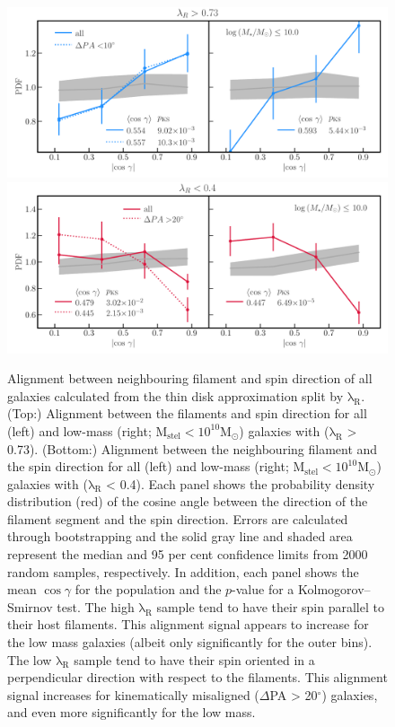 \begin{figure}
\centering\includegraphics[width=\textwidth]{thesis/latex/cw_spin/spin_fil_high_lambdaR_2in1.pdf}\\
\centering\includegraphics[width=\textwidth]{thesis/latex/cw_spin/spin_fil_low_lambdaR_2in1.pdf}
\caption{Alignment between neighbouring filament and spin direction of all galaxies calculated from the thin disk approximation split by $\mathrm{\lambda_R}$. (Top:) Alignment between the filaments and spin direction for all (left) and low-mass (right; $\mathrm{M_{stel} < 10^{10} M_{\odot}}$) galaxies with ($\mathrm{\lambda_{R}}$ > 0.73). (Bottom:) Alignment between the neighbouring filament and the spin direction for all (left) and low-mass (right; $\mathrm{M_{stel} < 10^{10} M_{\odot}}$) galaxies with ($\mathrm{\lambda_{R}}$ < 0.4). Each panel shows the probability density distribution (red) of the cosine angle between the direction of the filament segment and the spin direction. Errors are calculated through bootstrapping and the solid gray line and shaded area represent the median and 95 per cent confidence limits from 2000 random samples, respectively. In addition, each panel shows the mean $\cos \gamma$ for the population and the $p$-value for a Kolmogorov--Smirnov test. The high $\mathrm{\lambda_R}$ sample tend to have their spin parallel to their host filaments. This alignment signal appears to increase for the low mass galaxies (albeit only significantly for the outer bins). The low $\mathrm{\lambda_R}$ sample tend to have their spin oriented in a perpendicular direction with respect to the filaments. This alignment signal increases for kinematically misaligned ($\Delta$PA > 20$^{\circ}$) galaxies, and even more significantly for the low mass.}
\label{fig:lambdaR_spin_alignment}
\end{figure} 

